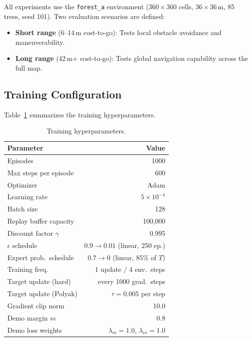 \documentclass[conference]{IEEEtran}
\begin{document}
All experiments use the \texttt{forest\_a} environment ($360 \times 360$ cells, $36 \times 36$\,m, 85 trees, seed 101).
Two evaluation scenarios are defined:
\begin{itemize}
    \item \textbf{Short range} (6--14\,m cost-to-go): Tests local obstacle avoidance and maneuverability.
    \item \textbf{Long range} (42\,m+ cost-to-go): Tests global navigation capability across the full map.
\end{itemize}

\subsection{Training Configuration}

Table~\ref{tab:hyperparams} summarizes the training hyperparameters.

\begin{table}[t]
\centering
\caption{Training hyperparameters.}
\label{tab:hyperparams}
\footnotesize
\begin{tabular}{@{}lr@{}}
\toprule
\textbf{Parameter} & \textbf{Value} \\
\midrule
Episodes                   & 1000 \\
Max steps per episode      & 600 \\
Optimizer                  & Adam \\
Learning rate              & $5 \times 10^{-4}$ \\
Batch size                 & 128 \\
Replay buffer capacity     & 100{,}000 \\
Discount factor $\gamma$   & 0.995 \\
$\epsilon$ schedule        & $0.9 \to 0.01$ (linear, 250 ep.) \\
Expert prob.\ schedule     & $0.7 \to 0$ (linear, $85\%$ of $T$) \\
Training freq.             & 1 update / 4 env.\ steps \\
Target update (hard)       & every 1000 grad.\ steps \\
Target update (Polyak)     & $\tau = 0.005$ per step \\
Gradient clip norm         & 10.0 \\
Demo margin $m$            & 0.8 \\
Demo loss weights          & $\lambda_m = 1.0$, $\lambda_{\text{ce}} = 1.0$ \\
\bottomrule
\end{tabular}
\end{table}
\end{document}
